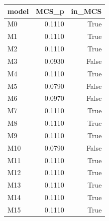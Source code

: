 \begin{tabular}{lrr}
\toprule
model & MCS_p & in_MCS \\
\midrule
M0 & 0.1110 & True \\
M1 & 0.1110 & True \\
M2 & 0.1110 & True \\
M3 & 0.0930 & False \\
M4 & 0.1110 & True \\
M5 & 0.0790 & False \\
M6 & 0.0970 & False \\
M7 & 0.1110 & True \\
M8 & 0.1110 & True \\
M9 & 0.1110 & True \\
M10 & 0.0790 & False \\
M11 & 0.1110 & True \\
M12 & 0.1110 & True \\
M13 & 0.1110 & True \\
M14 & 0.1110 & True \\
M15 & 0.1110 & True \\
\bottomrule
\end{tabular}
